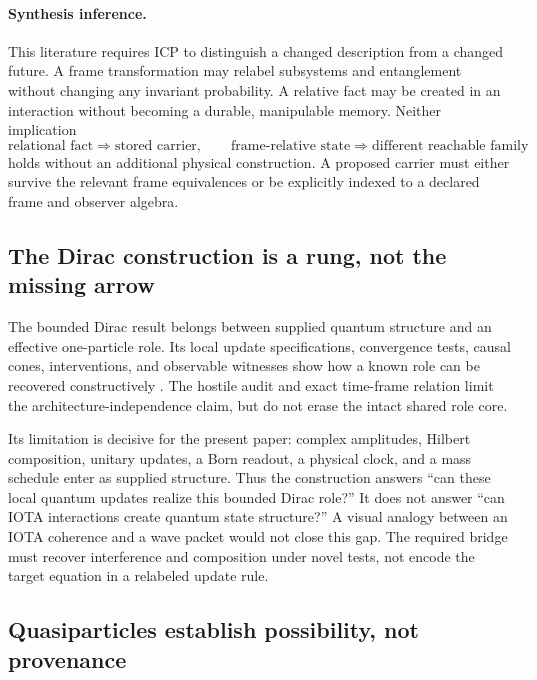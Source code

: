 \paragraph{Synthesis inference.}
This literature requires ICP to distinguish a changed description from a
changed future.  A frame transformation may relabel subsystems and
entanglement without changing any invariant probability.  A relative fact may
be created in an interaction without becoming a durable, manipulable memory.
Neither implication
\begin{equation}
 \text{relational fact}\Rightarrow\text{stored carrier},\qquad
 \text{frame-relative state}\Rightarrow\text{different reachable family}
\end{equation}
holds without an additional physical construction.  A proposed carrier must
either survive the relevant frame equivalences or be explicitly indexed to a
declared frame and observer algebra.

\subsection{The Dirac construction is a rung, not the missing arrow}

The bounded Dirac result belongs between supplied quantum structure and an
effective one-particle role.  Its local update specifications, convergence
tests, causal cones, interventions, and observable witnesses show how a known
role can be recovered constructively \citep{Clark2026DiracRole}.  The hostile
audit and exact time-frame relation limit the architecture-independence claim,
but do not erase the intact shared role core.

Its limitation is decisive for the present paper: complex amplitudes, Hilbert
composition, unitary updates, a Born readout, a physical clock, and a mass
schedule enter as supplied structure.  Thus the construction answers
``can these local quantum updates realize this bounded Dirac role?''  It does
not answer ``can IOTA interactions create quantum state structure?''  A visual
analogy between an IOTA coherence and a wave packet would not close this gap.
The required bridge must recover interference and composition under novel
tests, not encode the target equation in a relabeled update rule.

\subsection{Quasiparticles establish possibility, not provenance}

